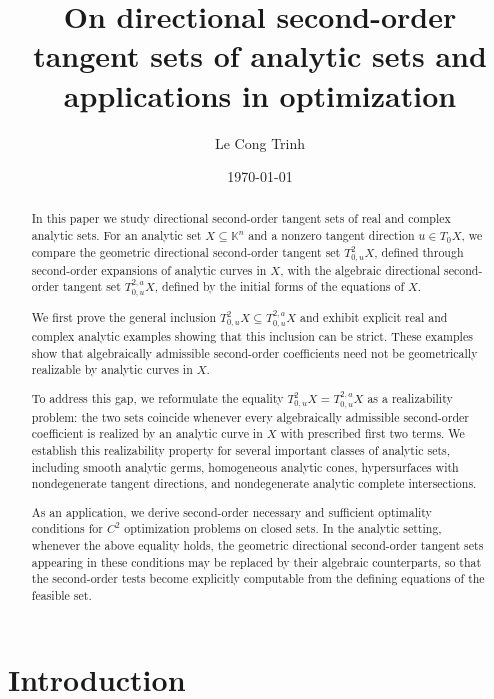 \documentclass[10pt,reqno]{amsart}
\theoremstyle{break-italic}
\theoremstyle{break-italic}
\theoremstyle{break-italic}
\theoremstyle{break-italic}
\theoremstyle{break-italic}
\theoremstyle{break-italic}
\theoremstyle{break-italic}
\theoremstyle{break-italic}
\theoremstyle{break-roman}
\theoremstyle{standard}
\theoremstyle{varthm-roman}
\theoremstyle{varthm-italic}
\theoremstyle{varthm-roman-break}
\theoremstyle{varthm-italic-break}
\theoremstyle{varthm-roman-no-punctuation}
\theoremstyle{varthm-italic-no-punctuation}
\numberwithin{equation}{section}
\begin{document}
\title[On directional second-order   tangent sets of  analytic sets]{On directional second-order tangent sets of analytic sets and applications in optimization}
\author{Le Cong Trinh}

\date{\today}
\begin{abstract}
In this paper we study directional second-order tangent sets of real and complex analytic sets. For an analytic set $X\subseteq \mathbb K^n$ and a nonzero tangent direction $u\in T_0X$, we compare the geometric directional second-order tangent set $T^2_{0,u}X$, defined through second-order expansions of analytic curves in $X$, with the algebraic directional second-order tangent set $T^{2,a}_{0,u}X$, defined by the initial forms of the equations of $X$.

We first prove the general inclusion
$T^2_{0,u}X\subseteq T^{2,a}_{0,u}X$
and exhibit explicit real and complex analytic examples showing that this inclusion can be strict. These examples show that algebraically admissible second-order coefficients need not be geometrically realizable by analytic
curves in $X$.

To address this gap, we reformulate the equality \(T^2_{0,u}X=T^{2,a}_{0,u}X\) as a realizability problem: the two sets coincide whenever every algebraically admissible second-order coefficient is realized by an analytic curve in $X$ with prescribed first two terms. We establish this realizability property for several important classes of analytic sets, including smooth analytic germs, homogeneous analytic cones, hypersurfaces with nondegenerate tangent directions, and nondegenerate analytic complete intersections.

As an application, we derive second-order necessary and sufficient optimality conditions for $C^2$ optimization problems on closed sets. In the analytic setting, whenever the above equality holds, the geometric directional second-order tangent sets appearing in these conditions may be replaced by their algebraic counterparts, so that the second-order tests become explicitly computable from the defining equations of the feasible set.
\end{abstract}
\maketitle

\section{Introduction}
\end{document}

